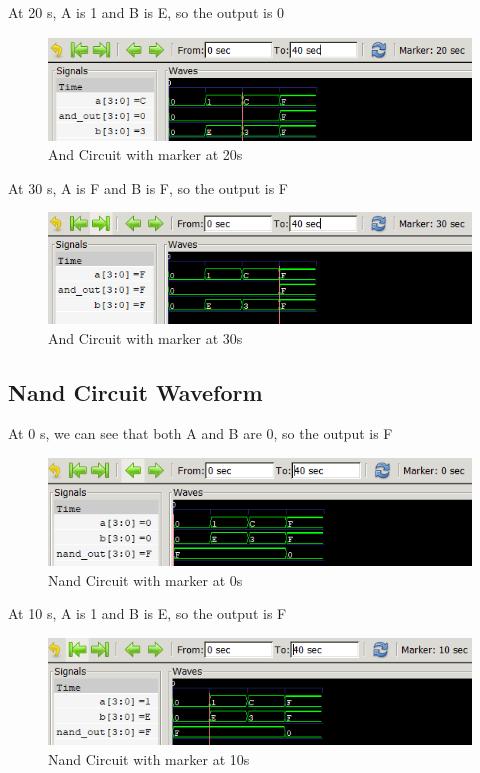 \documentclass[12pt]{article}
\begin{document}
At 20 s, A is 1 and B is E, so the output is 0
\begin{figure}[h]
    \centering
    \includegraphics[width = 1.0\textwidth]{figs/And20.png}
    \caption{And Circuit with marker at 20s}
    \label{fig:enter-label}
\end{figure}


\newpage


At 30 s, A is F and B is F, so the output is F
\begin{figure}[h]
    \centering
    \includegraphics[width = 1.0\textwidth]{figs/And30.png}
    \caption{And Circuit with marker at 30s}
    \label{fig:enter-label}
\end{figure}




\subsection{Nand Circuit Waveform}

At 0 s, we can see that both A and B are 0, so the output is F
\begin{figure}[h]
    \centering
    \includegraphics[width = 1.0\textwidth]{figs/Nand0.png}
    \caption{Nand Circuit with marker at 0s}
    \label{fig:enter-label}
\end{figure}

At 10 s, A is 1 and B is E, so the output is F
\begin{figure}[h]
    \centering
    \includegraphics[width = 1.0\textwidth]{figs/Nand10.png}
    \caption{Nand Circuit with marker at 10s}
    \label{fig:enter-label}
\end{figure}
\end{document}
